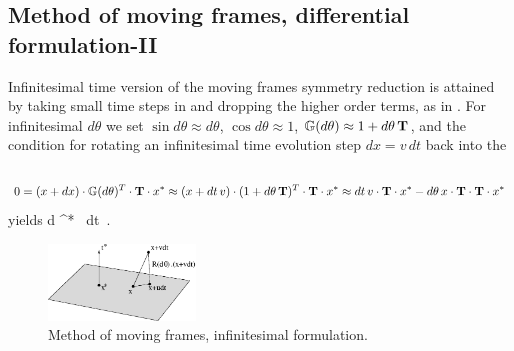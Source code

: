 \subsection{Method of moving frames, differential formulation-II}
\label{sect:MovFrameODE-II}


\noindent
Infinitesimal time version of the moving frames symmetry
reduction is attained by taking small time steps in
 and dropping the higher order terms, as
in . For infinitesimal  $d\theta$ we
set $\sin d\theta \approx d\theta$, $\cos d\theta \approx
1$, $\mathbb{G}(d\theta) \approx {1}+ d\theta \, \mathbf{T} $, and
the condition  for rotating an infinitesimal
time evolution step $dx = v\,dt$ back into the \slice\
\[
0 = (x + dx) \cdot \mathbb{G}(d\theta)^T \cdot \mathbf{T} \cdot x^{*}
  \approx (x + dt\,v) \cdot (1+ d\theta\,\mathbf{T})^T \cdot \mathbf{T} \cdot x^{*}
  \approx dt\,v \cdot \mathbf{T} \cdot x^{*} - d\theta\,x \cdot \mathbf{T} \cdot \mathbf{T} \cdot x^{*}
\]
yields
\beq
d\theta \approx {}
                     { \ssp \cdot \Lg \cdot \Lg \cdot \ssp^{*}} \,  dt
\,.

\begin{figure}[ht]
  \begin{center}
  \includegraphics[width=0.35\textwidth]{../figs/infMF}     
  \caption{Method of moving frames, infinitesimal formulation.}
  \end{center}
 \label{fig:infMF}
\end{figure}

